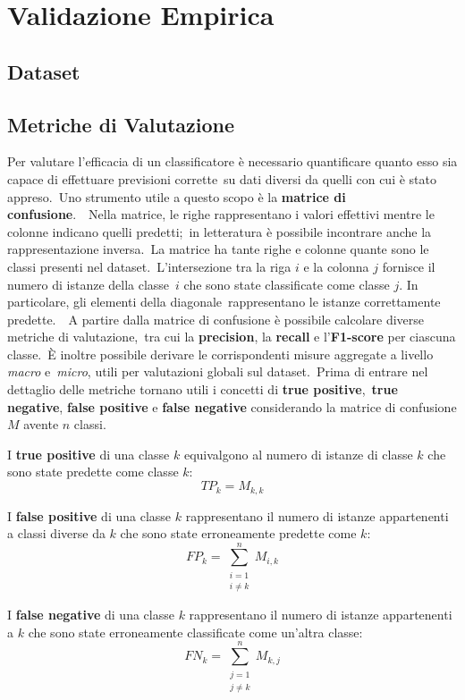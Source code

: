 \chapter{Validazione Empirica}

\section{Dataset}

\section{Metriche di Valutazione}

Per valutare l'efficacia di un classificatore è necessario quantificare quanto esso sia capace di effettuare previsioni corrette\
su dati diversi da quelli con cui è stato appreso.\
Uno strumento utile a questo scopo è la \textbf{matrice di confusione}.\
\
Nella matrice, le righe rappresentano i valori effettivi mentre le colonne indicano quelli predetti;\
in letteratura è possibile incontrare anche la rappresentazione inversa.\
La matrice ha tante righe e colonne quante sono le classi presenti nel dataset.\
L'intersezione tra la riga $i$ e la colonna $j$ fornisce il numero di istanze della classe\
$i$ che sono state classificate come classe $j$. In particolare, gli elementi della diagonale\
rappresentano le istanze correttamente predette.\
\
A partire dalla matrice di confusione è possibile calcolare diverse metriche di valutazione,\
tra cui la \textbf{precision}, la \textbf{recall} e l'\textbf{F1-score} per ciascuna classe.\
È inoltre possibile derivare le corrispondenti misure aggregate a livello \textit{macro} e\
\textit{micro}, utili per valutazioni globali sul dataset.\
Prima di entrare nel dettaglio delle metriche tornano utili i concetti di \textbf{true positive},\
\textbf{true negative}, \textbf{false positive} e \textbf{false negative} considerando la matrice di confusione $M$ avente $n$ classi.

I \textbf{true positive} di una classe $k$ equivalgono al numero di istanze di classe $k$ che
sono state predette come classe $k$:
\[
    TP_{k} = M_{k,k}
\]

I \textbf{false positive} di una classe $k$ rappresentano il numero di istanze appartenenti a
classi diverse da $k$ che sono state erroneamente predette come $k$:
\[
    FP_{k} = \sum_{\substack{i=1 \\ i \neq k}}^{n} M_{i,k}
\]

I \textbf{false negative} di una classe $k$ rappresentano il numero di istanze appartenenti a
$k$ che sono state erroneamente classificate come un'altra classe:
\[
    FN_{k} = \sum_{\substack{j=1 \\ j \neq k}}^{n} M_{k,j}
\]

